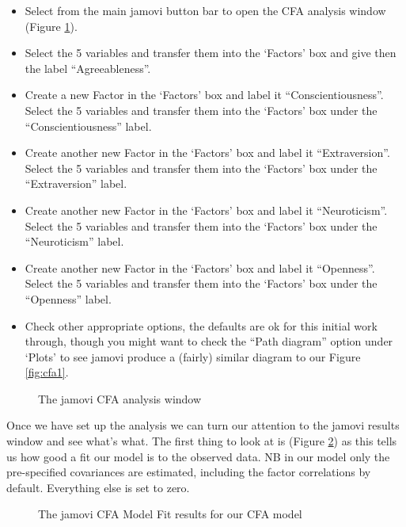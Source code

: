 \begin{itemize} \itemsep -2pt
\item Select  from the main jamovi button bar to open the CFA analysis window (Figure \ref{fig:cfa2}).
\item Select the 5  variables and transfer them into the ‘Factors’ box and give then the label “Agreeableness”.
\item Create a new Factor in the ‘Factors’ box and label it “Conscientiousness”. Select the 5  variables and transfer them into the ‘Factors’ box under the “Conscientiousness” label. 
\item Create another new Factor in the ‘Factors’ box and label it “Extraversion”. Select the 5  variables and transfer them into the ‘Factors’ box under the “Extraversion” label.
\item Create another new Factor in the ‘Factors’ box and label it “Neuroticism”. Select the 5  variables and transfer them into the ‘Factors’ box under the “Neuroticism” label.
\item Create another new Factor in the ‘Factors’ box and label it “Openness”. Select the 5  variables and transfer them into the ‘Factors’ box under the “Openness” label.
\item Check other appropriate options, the defaults are ok for this initial work through, though you might want to check the “Path diagram” option under ‘Plots’ to see jamovi produce a (fairly) similar diagram to our Figure \ref{fig:cfa1}.
\end{itemize}

\begin{figure}[!htp]
\begin{center}
\caption{The jamovi CFA analysis window}
\label{fig:cfa2}
\HR
\end{center}
\end{figure}

Once we have set up the analysis we can turn our attention to the jamovi results window and see what’s what. The first thing to look at is  (Figure \ref{fig:cfa3}) as this tells us how good a fit our model is to the observed data. NB in our model only the pre-specified covariances are estimated, including the factor correlations by default. Everything else is set to zero.

\begin{figure}[!htb]
\begin{center}
\caption{The jamovi CFA Model Fit results for our CFA model}
\label{fig:cfa3}
\HR
\end{center}
\end{figure}

